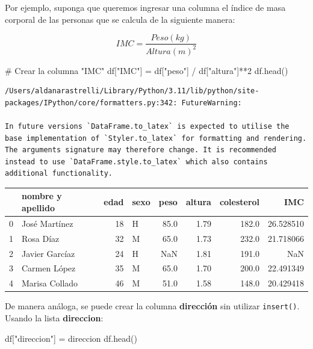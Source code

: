 \documentclass[
  letterpaper,
  DIV=11,
  numbers=noendperiod]{scrreprt}
\newenvironment{Shaded}{\begin{snugshade}}{\end{snugshade}}
\newcommand{\CommentTok}[1]{\textcolor[rgb]{0.37,0.37,0.37}{#1}}
\newcommand{\DecValTok}[1]{\textcolor[rgb]{0.68,0.00,0.00}{#1}}
\newcommand{\NormalTok}[1]{\textcolor[rgb]{0.00,0.23,0.31}{#1}}
\newcommand{\OperatorTok}[1]{\textcolor[rgb]{0.37,0.37,0.37}{#1}}
\newcommand{\StringTok}[1]{\textcolor[rgb]{0.13,0.47,0.30}{#1}}
\begin{document}
Por ejemplo, suponga que queremos ingresar una columna el índice de masa
corporal de las personas que se calcula de la siguiente manera:

\[
IMC = \frac{Peso(kg)}{Altura(m)^2}\]

\begin{Shaded}
\begin{Highlighting}[]
\CommentTok{\# Crear la columna "IMC"}
\NormalTok{df[}\StringTok{"IMC"}\NormalTok{] }\OperatorTok{=}\NormalTok{ df[}\StringTok{"peso"}\NormalTok{] }\OperatorTok{/}\NormalTok{ df[}\StringTok{"altura"}\NormalTok{]}\OperatorTok{**}\DecValTok{2}
\NormalTok{df.head()}
\end{Highlighting}
\end{Shaded}

\begin{verbatim}
/Users/aldanarastrelli/Library/Python/3.11/lib/python/site-packages/IPython/core/formatters.py:342: FutureWarning:

In future versions `DataFrame.to_latex` is expected to utilise the base implementation of `Styler.to_latex` for formatting and rendering. The arguments signature may therefore change. It is recommended instead to use `DataFrame.style.to_latex` which also contains additional functionality.
\end{verbatim}

\begin{tabular}{llrlrrrr}
\toprule
{} & nombre y apellido &  edad & sexo &  peso &  altura &  colesterol &        IMC \\
\midrule
0 &     José Martínez &    18 &    H &  85.0 &    1.79 &       182.0 &  26.528510 \\
1 &         Rosa Díaz &    32 &    M &  65.0 &    1.73 &       232.0 &  21.718066 \\
2 &    Javier Garcíaz &    24 &    H &   NaN &    1.81 &       191.0 &        NaN \\
3 &      Carmen López &    35 &    M &  65.0 &    1.70 &       200.0 &  22.491349 \\
4 &    Marisa Collado &    46 &    M &  51.0 &    1.58 &       148.0 &  20.429418 \\
\bottomrule
\end{tabular}

De manera análoga, se puede crear la columna \textbf{dirección} sin
utilizar \texttt{insert()}. Usando la lista \textbf{direccion}:

\begin{Shaded}
\begin{Highlighting}[]
\NormalTok{df[}\StringTok{"direccion"}\NormalTok{] }\OperatorTok{=}\NormalTok{ direccion}
\NormalTok{df.head()}
\end{Highlighting}
\end{Shaded}
\end{document}
